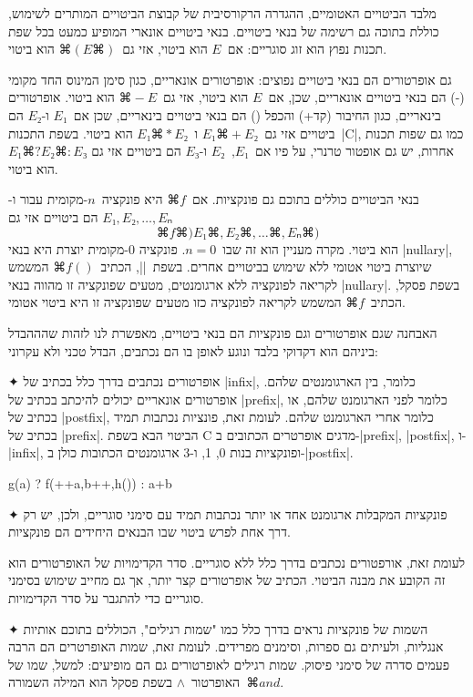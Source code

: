 מלבד הביטויים האטומיים, ההגדרה הרקורסיבית של קבוצת הביטויים המותרים לשימוש,
כוללת בתוכה גם רשימה של בנאי ביטויים. בנאי ביטויים אונארי המופיע כמעט בכל שפת
תכנות נפוץ הוא זוג סוגריים: אם~$E$ הוא ביטוי, אזי 
גם~$⌘(E⌘)$ הוא ביטוי.

גם אופרטורים הם בנאי ביטויים נפוצים: אופרטורים אונאריים, כגון סימן המינוס החד
מקומי (-) הם בנאי ביטויים אונאריים, שכן, אם~$E$ הוא ביטוי, אזי גם~$⌘-E$ הוא
ביטוי. אופרטורים בינאריים, כגון החיבור (קד+) והכפל () הם בנאי ביטויים
בינאריים, שכן אם~$E₁$ ו-$E₂$ הם ביטויים אזי גם~$E₁⌘+E₂$ ו~$E₁⌘*E₂$ הוא ביטוי.
בשפת התכנות~\E|C|, כמו גם שפות תכנות אחרות, יש גם אופטור טרנרי, על פיו
אם~$E₁$,~$E₂$ ו-$E₃$ הם ביטויים אזי גם $E₁⌘?E₂⌘:E₃$ הוא ביטוי.

בנאי הביטויים כוללים בתוכם גם פונקציות. אם~$⌘f$ היא פונקציה~$n$-מקומית עבור
ו-$E₁,E₂,…,Eₙ$ הם ביטויים אזי גם \[
  ⌘f⌘)E₁⌘,E₂⌘,…⌘,Eₙ⌘)
\] הוא ביטוי. מקרה מעניין הוא זה שבו~$n=0$. פונקציה 0-מקומית יוצרת היא בנאי
\E|nullary|, שיוצרת ביטוי אטומי ללא שימוש בביטויים אחרים. בשפת~\E|\CPL|,
הכתיב~$⌘{f()}$ המשמש לקריאה לפונקציה ללא ארגומנטים, מטעים שפונקציה זו מהווה
בנאי \E|nullary|. בשפת פסקל, הכתיב~$⌘f$ המשמש לקריאה לפונקציה כזו מטעים
שפונקציה זו היא ביטוי אטומי.

האבחנה שגם אופרטורים וגם פונקציות הם בנאי ביטויים, מאפשרת לנו לזהות שהההבדל
ביניהם הוא דקדוקי בלבד ונוגע לאופן בו הם נכתבים, הבדל טכני ולא עקרוני:

✦ אופרטורים נכתבים בדרך כלל בכתיב של \E|infix|, כלומר, בין הארגומנטים שלהם.
אופרטורים אונאריים יכולים להיכתב בכתיב של \E|prefix|, כלומר לפני הארגומנט שלהם,
או בכתיב של \E|postfix|, כלומר אחרי הארגומנט שלהם. לעומת זאת, פונציות נכתבות
תמיד בכתיב של \E|prefix|.
הביטוי הבא בשפת C מדגים אופרטרים הכתובים ב-\E|prefix|, \E|postfix|, ו-\E|infix|,
ופונקציות בנות 0, 1, ו-3 ארגומנטים הכתובות כולן ב-\E|postfix|.
\begin{CPP}
  g(a) ? f(++a,b++,h()) : a+b
\end{CPP}
✦ פונקציות המקבלות ארגומנט אחד או יותר נכתבות תמיד עם סימני סוגריים, ולכן, יש
רק דרך אחת לפרש ביטוי שבו הבנאים היחידים הם פונקציות.

לעומת זאת, אורפטורים נכתבים בדרך כלל ללא סוגריים. סדר הקדימויות של האופרטורים
הוא זה הקובע את מבנה הביטוי. הכתיב של אופרטורים קצר יותר, אך גם מחייב
שימוש בסימני סוגריים כדי להתגבר על סדר הקדימויות.

✦ השמות של פונקציות נראים בדרך כלל כמו "שמות רגילים", הכוללים בתוכם אותיות
אנגליות, ולעיתים גם ספרות, וסימנים מפרידים. לעומת זאת, שמות האופרטרים הם הרבה 
פעמים סדרה של סימני פיסוק. שמות רגילים לאופרטורים גם הם מופיעים:
למשל, שמו של האופרטור~$∧$ בשפת פסקל הוא המילה השמורה~$⌘{and}$.

